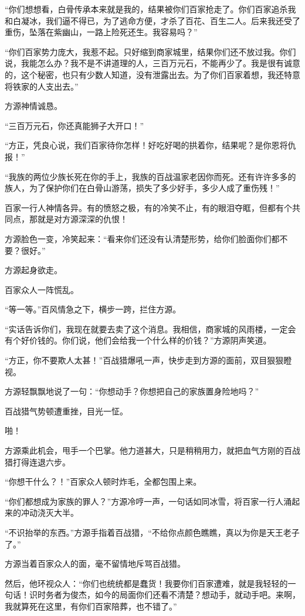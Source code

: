 \begin{this_body}
“你们想想看，白骨传承本来就是我的，结果被你们百家抢走了。你们百家追杀我和白凝冰，我们逼不得已，为了逃命方便，才杀了百花、百生二人。后来我还受了重伤，坠落在紫幽山，一路上险死还生。我容易吗？”

“你们百家势力庞大，我惹不起。只好缩到商家城里，结果你们还不放过我。你们说，我能怎么办？我不是不讲道理的人，三百万元石，不能再少了。我是很有诚意的，这个秘密，也只有少数人知道，没有泄露出去。为了你们百家着想，我还特意将铁家的人支出去。”

方源神情诚恳。

“三百万元石，你还真能狮子大开口！”

“方正，凭良心说，我们百家待你怎样！好吃好喝的拱着你，结果呢？是你恩将仇报！”

“我族的两位少族长死在你的手上，我族的百战温家老因你而死。还有许许多多的族人，为了保护你们在白骨山游荡，损失了多少好手，多少人成了重伤残！”

百家一行人神情各异。有的愤怒之极，有的冷笑不止，有的眼泪夺眶，但都有个共同点，那就是对方源深深的仇恨！

方源脸色一变，冷笑起来：“看来你们还没有认清楚形势，给你们脸面你们都不要？很好。”

方源起身欲走。

百家众人一阵慌乱。

“等一等。”百风情急之下，横步一跨，拦住方源。

“实话告诉你们，我现在就要去卖了这个消息。我相信，商家城的风雨楼，一定会有个好价钱的。你们说，他们会给我一个什么样的价钱？”方源阴声笑道。

“方正，你不要欺人太甚！”百战猎爆吼一声，快步走到方源的面前，双目狠狠瞪视。

方源轻飘飘地说了一句：“你想动手？你想把自己的家族置身险地吗？”

百战猎气势顿遭重挫，目光一怔。

啪！

方源乘此机会，甩手一个巴掌。他力道甚大，只是稍稍用力，就把血气方刚的百战猎打得连退六步。

“你想干什么？！”百家众人顿时炸毛，全都包围上来。

“你们都想成为家族的罪人？”方源冷哼一声，一句话如同冰雪，将百家一行人涌起来的冲动浇灭大半。

“不识抬举的东西。”方源手指着百战猎，“不给你点颜色瞧瞧，真以为你是天王老子了。”

方源当着百家众人的面，毫不留情地斥骂百战猎。

然后，他环视众人：“你们也统统都是蠢货！我要你们百家遭难，就是我轻轻的一句话！识时务者为俊杰，如今的局面你们还看不清楚？想动手，就动手吧。来啊，我就算死在这里，有你们百家陪葬，也不错了。”


\end{this_body}
